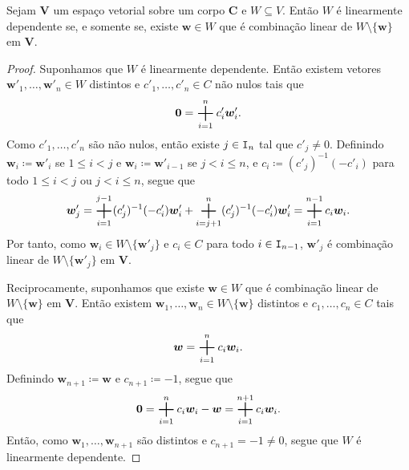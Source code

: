 \begin{prop}
	Sejam $\bm V$ um espaço vetorial sobre um corpo $\bm C$ e $W \subseteq V$. Então $W$ é linearmente dependente se, e somente se, existe $\bm w \in W$ que é combinação linear de $W \setminus \{\bm w\}$ em $\bm V$.
\end{prop}
\begin{proof}
	Suponhamos que $W$ é linearmente dependente. Então existem vetores $\bm w'_1,\ldots,\bm w'_n \in W$ distintos e $c'_1,\ldots,c'_n \in C$ não nulos tais que
	\begin{equation*}
	\bm 0 = \bigsum_{i=1}^n c'_i \bm w'_i.
	\end{equation*}
Como $c'_1,\ldots,c'_n$ são não nulos, então existe $j \in \mathtt I_n$ tal que $c'_j \neq 0$. Definindo $\bm w_i \coloneqq \bm w'_i$ se $1 \leq i < j$ e $\bm w_i \coloneqq \bm w'_{i-1}$ se $j < i \leq n$, e $c_i \coloneqq (c'_j)^{-1}(-c'_i)$ para todo $1 \leq i < j$ ou $j < i \leq n$, segue que
	\begin{equation*}
	\bm w'_j = \bigsum_{i=1}^{j-1} (c'_j)^{-1}(-c'_i) \bm w'_i + \bigsum_{i=j+1}^n (c'_j)^{-1}(-c'_i) \bm w'_i = \bigsum_{i=1}^{n-1} c_i \bm w_i.
	\end{equation*}
Por tanto, como $\bm w_i \in W \setminus \{\bm w'_j\}$ e $c_i \in C$ para todo $i \in \mathtt I_{n-1}$, $\bm w'_j$ é combinação linear de $W \setminus \{\bm w'_j\}$ em $\bm V$.

	Reciprocamente, suponhamos que existe $\bm w \in W$ que é combinação linear de $W \setminus \{\bm w\}$ em $\bm V$. Então existem $\bm w_1, \ldots, \bm w_n \in W \setminus \{\bm w\}$ distintos e $c_1, \ldots, c_n \in C$ tais que
	\begin{equation*}
	\bm w = \bigsum_{i=1}^n c_i \bm w_i.
	\end{equation*}
Definindo $\bm w_{n+1} \coloneqq \bm w$ e $c_{n+1} \coloneqq -1$, segue que
	\begin{equation*}
	\bm 0 = \bigsum_{i=1}^n c_i \bm w_i - \bm w = \bigsum_{i=1}^{n+1} c_i \bm w_i.
	\end{equation*}
Então, como $\bm w_1, \ldots, \bm w_{n+1}$ são distintos e $c_{n+1} = -1 \neq 0$, segue que $W$ é linearmente dependente.
\end{proof}


